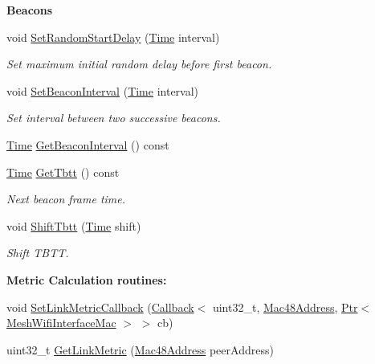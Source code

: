 \begin{Indent}{\bf Beacons}\par
\begin{DoxyCompactItemize}
\item 
void \hyperlink{classns3_1_1MeshWifiInterfaceMac_a424d9cc1c6c2e6dbce3878abc0c484ed}{Set\+Random\+Start\+Delay} (\hyperlink{classns3_1_1Time}{Time} interval)
\begin{DoxyCompactList}\small\item\em Set maximum initial random delay before first beacon. \end{DoxyCompactList}\item 
void \hyperlink{classns3_1_1MeshWifiInterfaceMac_a2aef7f3da43c8195e3cdf099e193b6c9}{Set\+Beacon\+Interval} (\hyperlink{classns3_1_1Time}{Time} interval)
\begin{DoxyCompactList}\small\item\em Set interval between two successive beacons. \end{DoxyCompactList}\item 
\hyperlink{classns3_1_1Time}{Time} \hyperlink{classns3_1_1MeshWifiInterfaceMac_a8fdd279445044f14516ab3b28678977b}{Get\+Beacon\+Interval} () const 
\item 
\hyperlink{classns3_1_1Time}{Time} \hyperlink{classns3_1_1MeshWifiInterfaceMac_ab5b6b4e421f4ae94e39135eae135faba}{Get\+Tbtt} () const 
\begin{DoxyCompactList}\small\item\em Next beacon frame time. \end{DoxyCompactList}\item 
void \hyperlink{classns3_1_1MeshWifiInterfaceMac_a3390bb70ec47d738f6ffb37c476bbcfc}{Shift\+Tbtt} (\hyperlink{classns3_1_1Time}{Time} shift)
\begin{DoxyCompactList}\small\item\em Shift T\+B\+TT. \end{DoxyCompactList}\end{DoxyCompactItemize}
\end{Indent}
\begin{Indent}{\bf Metric Calculation routines\+:}\par
\begin{DoxyCompactItemize}
\item 
void \hyperlink{classns3_1_1MeshWifiInterfaceMac_a10c9c1a4cfa61e0372c93c1f32db426f}{Set\+Link\+Metric\+Callback} (\hyperlink{classns3_1_1Callback}{Callback}$<$ uint32\+\_\+t, \hyperlink{classns3_1_1Mac48Address}{Mac48\+Address}, \hyperlink{classns3_1_1Ptr}{Ptr}$<$ \hyperlink{classns3_1_1MeshWifiInterfaceMac}{Mesh\+Wifi\+Interface\+Mac} $>$ $>$ cb)
\item 
uint32\+\_\+t \hyperlink{classns3_1_1MeshWifiInterfaceMac_a78e833b9eecbb5b29e2d464d4c405780}{Get\+Link\+Metric} (\hyperlink{classns3_1_1Mac48Address}{Mac48\+Address} peer\+Address)
\end{DoxyCompactItemize}
\end{Indent}
